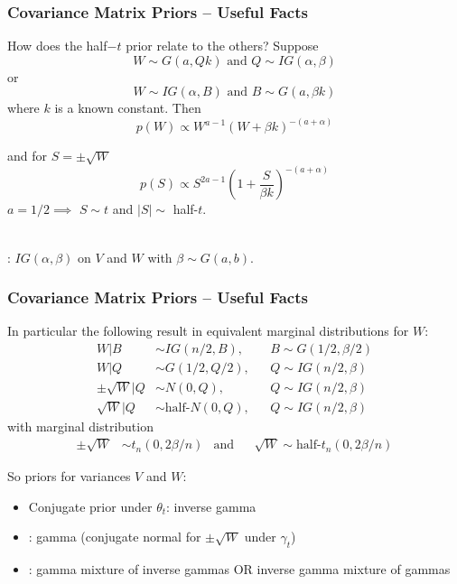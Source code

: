 \documentclass[xcolor=dvipsnames]{beamer}
\begin{document}


\begin{frame}
\frametitle{Covariance Matrix Priors -- Useful Facts}
How does the half$-t$ prior relate to the others? Suppose
\[
W\sim G(a,Qk) \mbox{ and } Q\sim IG(\alpha,\beta)
\]
or
\[
W\sim IG(\alpha, B) \mbox{ and } B\sim G(a,\beta k)
\]
where $k$ is a known constant. \pause Then
\[
p(W) \propto W^{a-1}(W + \beta k)^{-(a + \alpha)}
\]

and for $S=\pm\sqrt{W}$
\[
p(S) \propto S^{2a-1}\left(1 + \frac{S}{\beta k}\right)^{-(a + \alpha)}
\]
$a=1/2 \implies $ $S\sim t$ and $|S| \sim$ half-$t$.\\~

\pause \citet{huang2013simple}: $IG(\alpha,\beta)$ on $V$ and $W$ with $\beta\sim G(a,b)$.
\end{frame}

\begin{frame}
\frametitle{Covariance Matrix Priors -- Useful Facts}
In particular the following result in equivalent marginal distributions for $W$:
\begin{align*}
W|B &\sim IG(n/2,B), &&B\sim G(1/2,\beta/2)\\
W|Q &\sim G(1/2,Q/2), &&Q\sim IG(n/2,\beta)\\
\pm\sqrt{W}|Q &\sim N(0,Q), &&Q\sim IG(n/2,\beta)\\
\sqrt{W}|Q &\sim \mbox{half-}N(0,Q), &&Q\sim IG(n/2,\beta)
\end{align*}
with marginal distribution
\begin{align*}
\pm\sqrt{W} &\sim t_n(0,2\beta/n) &\mbox{and}&& \sqrt{W} \sim \mbox{half-}t_n(0,2\beta/n)
\end{align*}

\pause So priors for variances $V$ and $W$:
\begin{itemize}
\item Conjugate prior under $\theta_t$: inverse gamma

\item \citet{fruhwirth2008bayesian}: gamma (conjugate normal for $\pm\sqrt{W}$ under $\gamma_t$)
\item \citet{gelman2006prior,huang2013simple}: gamma mixture of inverse gammas OR inverse gamma mixture of gammas
\end{itemize}
\end{frame}
\end{document}
